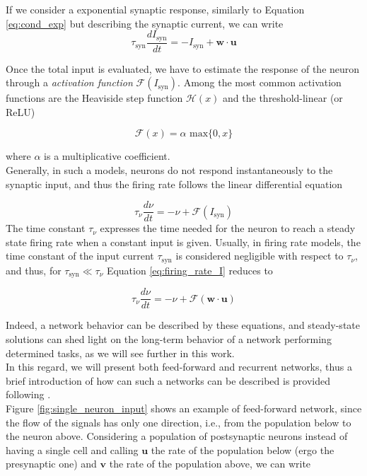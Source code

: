 \documentclass[a4paper, 12pt, twoside, openright]{book}
\begin{document}
If we consider a exponential synaptic response, similarly to Equation \eqref{eq:cond_exp} but describing the synaptic current, we can write
\begin{equation}
    \label{eq:firing_rate_current}
    \tau_{\text{syn}}\dfrac{dI_{\text{syn}}}{dt}=-I_{\text{syn}}+\mathbf{w}\cdot\mathbf{u}
\end{equation}

Once the total input is evaluated, we have to estimate the response of the neuron through a \textit{activation function} $\mathcal{F}(I_{\text{syn}})$. Among the most common activation functions are the Heaviside step function $\mathcal{H}(x)$ and the threshold-linear (or ReLU)

\begin{equation}
\label{eq:ReLu}
\mathcal{F}(x) = \alpha \text{ max}\{ 0, x\}
\end{equation}

where $\alpha$ is a multiplicative coefficient.\\
Generally, in such a models, neurons do not respond instantaneously to the synaptic input, and thus the firing rate follows the linear differential equation

\begin{equation}
    \label{eq:firing_rate_I}
    \tau_{\nu}\dfrac{d\nu}{dt}=-\nu+\mathcal{F}(I_{\text{syn}})
\end{equation}
The time constant $\tau_{\nu}$ expresses the time needed for the neuron to reach a steady state firing rate when a constant input is given. Usually, in firing rate models, the time constant of the input current $\tau_{\text{syn}}$ is considered negligible with respect to $\tau_{\nu}$, and thus, for $\tau_{\text{syn}}\ll\tau_{\nu}$ Equation \eqref{eq:firing_rate_I} reduces to

\begin{equation}
    \label{eq:firing_rate}
    \tau_{\nu}\dfrac{d\nu}{dt}=-\nu+\mathcal{F}(\mathbf{w}\cdot\mathbf{u})
\end{equation}

Indeed, a network behavior can be described by these equations, and steady-state solutions can shed light on the long-term behavior of a network performing determined tasks, as we will see further in this work.\\
In this regard, we will present both feed-forward and recurrent networks, thus a brief introduction of how can such a networks can be described is provided following \cite{abbot2005}.\\
Figure \ref{fig:single_neuron_input} shows an example of feed-forward network, since the flow of the signals has only one direction, i.e., from the population below to the neuron above. Considering a population of postsynaptic neurons instead of having a single cell and calling $\mathbf{u}$ the rate of the population below (ergo the presynaptic one) and $\mathbf{v}$ the rate of the population above, we can write
\end{document}
